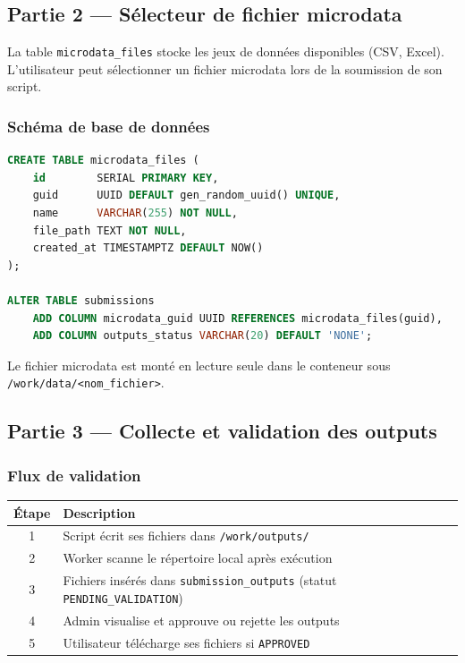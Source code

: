\documentclass[12pt,a4paper]{article}
\begin{document}
\subsection{Partie 2 — Sélecteur de fichier microdata}

La table \texttt{microdata\_files} stocke les jeux de données disponibles (CSV, Excel). L'utilisateur peut sélectionner un fichier microdata lors de la soumission de son script.

\subsubsection*{Schéma de base de données}

\begin{lstlisting}[language=SQL, caption={Tables microdata\_files et submissions (extrait)}]
CREATE TABLE microdata_files (
    id        SERIAL PRIMARY KEY,
    guid      UUID DEFAULT gen_random_uuid() UNIQUE,
    name      VARCHAR(255) NOT NULL,
    file_path TEXT NOT NULL,
    created_at TIMESTAMPTZ DEFAULT NOW()
);

ALTER TABLE submissions
    ADD COLUMN microdata_guid UUID REFERENCES microdata_files(guid),
    ADD COLUMN outputs_status VARCHAR(20) DEFAULT 'NONE';
\end{lstlisting}

Le fichier microdata est monté en lecture seule dans le conteneur sous \texttt{/work/data/<nom\_fichier>}.

\subsection{Partie 3 — Collecte et validation des outputs}

\subsubsection*{Flux de validation}

\begin{center}
\begin{tabular}{|c|l|}
\hline
\textbf{Étape} & \textbf{Description} \\
\hline
1 & Script écrit ses fichiers dans \texttt{/work/outputs/} \\
2 & Worker scanne le répertoire local après exécution \\
3 & Fichiers insérés dans \texttt{submission\_outputs} (statut \texttt{PENDING\_VALIDATION}) \\
4 & Admin visualise et approuve ou rejette les outputs \\
5 & Utilisateur télécharge ses fichiers si \texttt{APPROVED} \\
\hline
\end{tabular}
\end{center}
\end{document}
